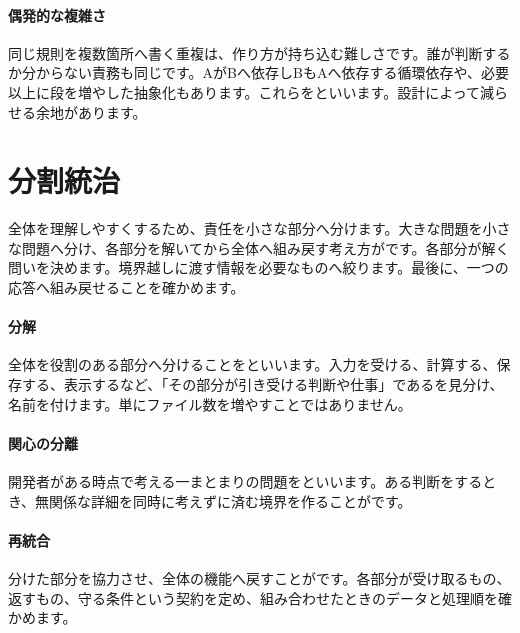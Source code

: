 \paragraph{偶発的な複雑さ}
        同じ規則を複数箇所へ書く重複は、作り方が持ち込む難しさです。誰が判断するか分からない責務も同じです。AがBへ依存しBもAへ依存する循環依存や、必要以上に段を増やした抽象化もあります。これらをといいます。設計によって減らせる余地があります。

\par
\endgroup
  \vspace{3mm}
\par
\endgroup


\section{分割統治}
\label{sec:04-software-engineering-03}

全体を理解しやすくするため、責任を小さな部分へ分けます。大きな問題を小さな問題へ分け、各部分を解いてから全体へ組み戻す考え方がです。各部分が解く問いを決めます。境界越しに渡す情報を必要なものへ絞ります。最後に、一つの応答へ組み戻せることを確かめます。

\begingroup
\begingroup
\paragraph{分解}
        全体を役割のある部分へ分けることをといいます。入力を受ける、計算する、保存する、表示するなど、「その部分が引き受ける判断や仕事」であるを見分け、名前を付けます。単にファイル数を増やすことではありません。

\par
\endgroup
\medskip
\begingroup
\paragraph{関心の分離}
        開発者がある時点で考える一まとまりの問題をといいます。ある判断をするとき、無関係な詳細を同時に考えずに済む境界を作ることがです。

\par
\endgroup
\medskip
\begingroup
\paragraph{再統合}
        分けた部分を協力させ、全体の機能へ戻すことがです。各部分が受け取るもの、返すもの、守る条件という契約を定め、組み合わせたときのデータと処理順を確かめます。

